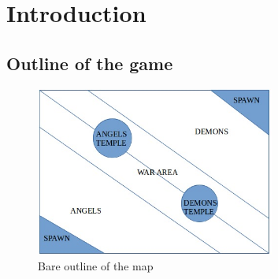 \chapter{Introduction}

\section{Outline of the game}
\begin{figure}[htp]
\centering
\includegraphics[width=0.7\textwidth]{outline.jpg}
\caption{\label{fig:outline}Bare outline of the map}
\end{figure}



